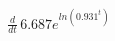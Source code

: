 \documentclass[preview]{standalone}
\begin{document}
\begin{align*}
\frac{d}{dt}\,6.687e^{ln(0.931^t)}
\end{align*}
\end{document}
